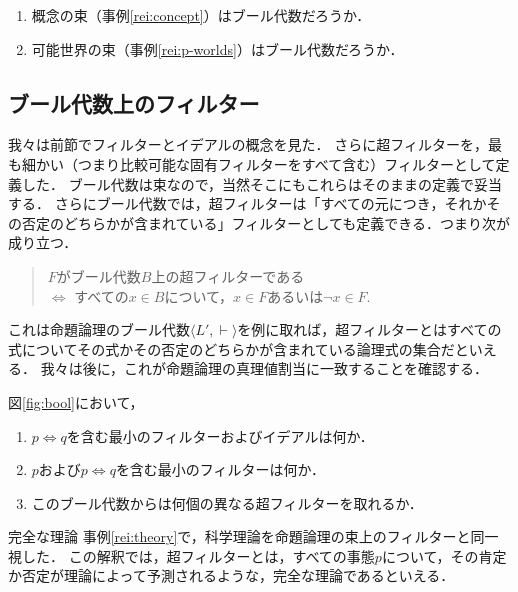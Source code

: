 \documentclass[11pt,a4paper, dvipdfmx]{jsarticle}
\begin{document}
\begin{renshu}{}{}
    \begin{enumerate}
        \item 概念の束（事例\ref{rei:concept}）はブール代数だろうか．
        \item 可能世界の束（事例\ref{rei:p-worlds}）はブール代数だろうか．
    \end{enumerate}
\end{renshu}



\subsection{ブール代数上のフィルター}

我々は前節でフィルターとイデアルの概念を見た．
さらに超フィルターを，最も細かい（つまり比較可能な固有フィルターをすべて含む）フィルターとして定義した．
ブール代数は束なので，当然そこにもこれらはそのままの定義で妥当する．
さらにブール代数では，超フィルターは「すべての元につき，それかその否定のどちらかが含まれている」フィルターとしても定義できる．つまり次が成り立つ．
\begin{prop}{}{}
    \begin{quote}
        $F$がブール代数$B$上の超フィルターである 
        \\ $\iff$ すべての$x \in B$について，$x \in F$あるいは$\neg x \in F$.    
    \end{quote}
\end{prop}

これは命題論理のブール代数$\langle L', \vdash \rangle$を例に取れば，超フィルターとはすべての式についてその式かその否定のどちらかが含まれている論理式の集合だといえる．
我々は後に，これが命題論理の真理値割当に一致することを確認する．

\begin{renshu}{}{}
    図\ref{fig:bool}において，
    \begin{enumerate}
        \item $p \iff q$を含む最小のフィルターおよびイデアルは何か．
        \item $p$および$p \iff q$を含む最小のフィルターは何か．
        \item このブール代数からは何個の異なる超フィルターを取れるか．
    \end{enumerate}
\end{renshu}

\begin{rei}{完全な理論}{}
事例\ref{rei:theory}で，科学理論を命題論理の束上のフィルターと同一視した．
この解釈では，超フィルターとは，すべての事態$p$について，その肯定か否定が理論によって予測されるような，完全な理論であるといえる．
\end{rei}    
\end{document}
